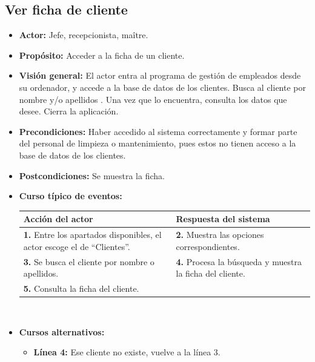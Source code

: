 \documentclass[spanish,a4paper,11pt, twoside]{report}	%
\begin{document}
	\subsection{Ver ficha de cliente}
			\begin{itemize}
			\item \textbf{Actor:} Jefe, recepcionista, maître.
			\item \textbf{Propósito:} Acceder a la ficha de un cliente.
			\item \textbf{Visión general:} El actor entra al programa de gestión de
						empleados desde su ordenador, y accede a la base de datos de los clientes. Busca
						al cliente por nombre y/o apellidos . Una vez que lo encuentra, consulta los
						datos que desee. Cierra la aplicación.
			\item \textbf{Precondiciones:} Haber accedido al sistema correctamente y formar
						parte del personal de limpieza o mantenimiento, pues estos no tienen acceso a la
						base de datos de los clientes.
			\item \textbf{Postcondiciones:} Se muestra la ficha.
			\item \textbf{Curso típico de eventos:} 	\\
				\begin{tabular}{|p{6cm}||p{6cm}|}
				\hline
				\textbf{Acción del actor} & \textbf{Respuesta del sistema} \\ \hline \hline
				\textbf{1.} Entre los apartados disponibles, el actor escoge el de “Clientes”. & 
				\textbf{2.} Muestra las opciones correspondientes. \\ \hline 
				\textbf{3.} Se busca el cliente por nombre o apellidos.  & 
				\textbf{4.} Procesa la búsqueda y muestra la ficha del cliente. \\ \hline 
				\textbf{5.} Consulta la ficha del cliente.& \\ \hline
				
			\end{tabular}
			\\
			\item \textbf{Cursos alternativos:} 
			\begin{itemize}
			\item  \textbf{Línea 4:} Ese cliente no existe, vuelve a la línea 3.
			\end {itemize}
		\end{itemize}


	\hspace{-1.2 true cm}	
\end{document}

